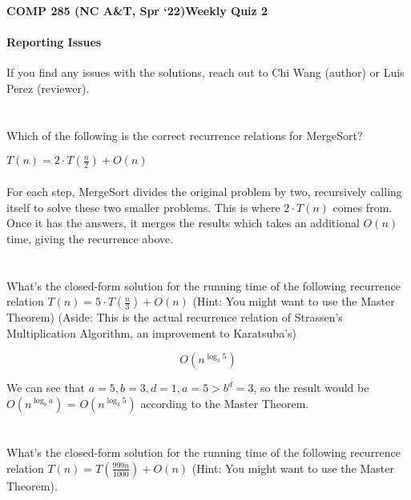 \documentclass [12pt]{article}
\begin{document}
 

{\LARGE \textbf {COMP 285 (NC A\&T, Spr `22)}\hfill \textbf {Weekly Quiz 2} } 

\begin{Instruction}

\paragraph{Reporting Issues} If you find any issues with the solutions, reach out to Chi Wang (author) or Luis Perez (reviewer).

\end{Instruction}


\section{} Which of the following is the correct recurrence relations for MergeSort?

\begin{Solution}
$T(n) = 2 \cdot T\left(\frac{n}{2}\right) + O(n)$
\paragraph{} 
 For each step, MergeSort divides the original problem by two, recursively calling itself to solve these two smaller problems. This is where $2 \cdot T(n)$ comes from. Once it has the answers, it merges the results which takes an additional $O(n)$ time, giving the recurrence above.
\end{Solution}


\section{} What's the closed-form solution for the running time of the following recurrence relation $T(n) = 5 \cdot T\left(\frac{n}{3}\right) + O(n)$ (Hint: You might want to use the Master Theorem) (Aside: This is the actual recurrence relation of Strassen's Multiplication Algorithm, an improvement to Karatsuba's)

\begin{Solution}
$$
O(n^{\log_3 5})
$$

We can see that $a=5, b=3, d=1, a=5 > b^d=3$, so the result would be  $O(n^{\log_b a})$ = $O(n^{\log_3 5})$ according to the Master Theorem.
\end{Solution}


\section{} What's the closed-form solution for the running time of the following recurrence relation $T(n) = T\left(\frac{999n}{1000}\right) + O(n)$ (Hint: You might want to use the Master Theorem).
\end{document}
